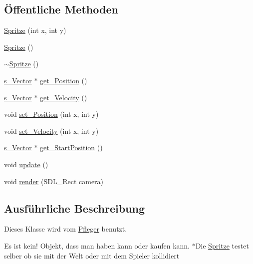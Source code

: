 \subsection*{Öffentliche Methoden}
\begin{DoxyCompactItemize}
\item 
\hyperlink{class_spritze_a786a149a9e6a937af87566a5c0ab432e}{Spritze} (int x, int y)
\item 
\hyperlink{class_spritze_a4cca3fc867fc55f6dde677c045d459d1}{Spritze} ()
\item 
\hyperlink{class_spritze_a5b57faf9fa3bccc91845bb399233c795}{$\sim$\-Spritze} ()
\item 
\hyperlink{structs___vector}{s\-\_\-\-Vector} $\ast$ \hyperlink{class_spritze_aef30f9337f9559b4873ee895a0c8f4fe}{get\-\_\-\-Position} ()
\item 
\hyperlink{structs___vector}{s\-\_\-\-Vector} $\ast$ \hyperlink{class_spritze_ad5f7645d831b543b1ca92bd4ccb9c876}{get\-\_\-\-Velocity} ()
\item 
void \hyperlink{class_spritze_acab9a7ff57ce3ce2f33a3480d04cbe19}{set\-\_\-\-Position} (int x, int y)
\item 
void \hyperlink{class_spritze_aa54b894d1a40b2c1156eb0e62779fa0e}{set\-\_\-\-Velocity} (int x, int y)
\item 
\hyperlink{structs___vector}{s\-\_\-\-Vector} $\ast$ \hyperlink{class_spritze_a5d305371f76fb207684c203e7b4e5fd8}{get\-\_\-\-Start\-Position} ()
\item 
void \hyperlink{class_spritze_aaf70068b9356284874156f19f5237c94}{update} ()
\item 
void \hyperlink{class_spritze_a2d1fac0870a40d50f0582e1efec53751}{render} (S\-D\-L\-\_\-\-Rect camera)
\end{DoxyCompactItemize}


\subsection{Ausführliche Beschreibung}
Dieses Klasse wird vom \hyperlink{class_pfleger}{Pfleger} benutzt. 

Es ist kein! Objekt, dass man haben kann oder kaufen kann. $\ast$\-Die \hyperlink{class_spritze}{Spritze} testet selber ob sie mit der Welt oder mit dem Spieler kollidiert 

